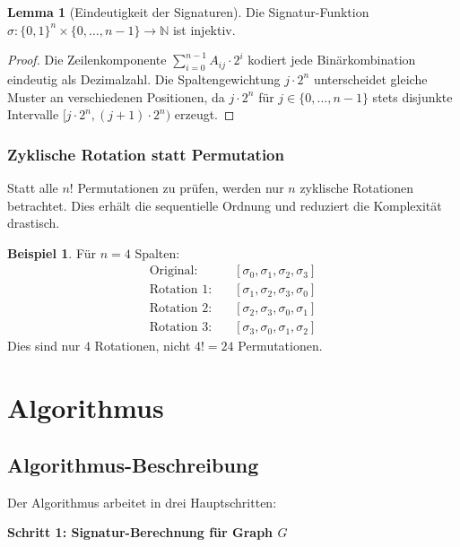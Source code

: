 \documentclass[a4paper,12pt]{article}
\theoremstyle{definition}
\newtheorem{beispiel}{Beispiel}
\newtheorem{lemma}{Lemma}
\begin{document}
\begin{lemma}[Eindeutigkeit der Signaturen]
	Die Signatur-Funktion $\sigma: \{0,1\}^n \times \{0,\ldots,n-1\} \to \mathbb{N}$ ist injektiv.
\end{lemma}

\begin{proof}
	Die Zeilenkomponente $\sum_{i=0}^{n-1} A_{ij} \cdot 2^i$ kodiert jede Binärkombination eindeutig als Dezimalzahl. Die Spaltengewichtung $j \cdot 2^n$ unterscheidet gleiche Muster an verschiedenen Positionen, da $j \cdot 2^n$ für $j \in \{0,\ldots,n-1\}$ stets disjunkte Intervalle $[j \cdot 2^n, (j+1) \cdot 2^n)$ erzeugt.
\end{proof}

\subsubsection{Zyklische Rotation statt Permutation}

Statt alle $n!$ Permutationen zu prüfen, werden nur $n$ zyklische Rotationen betrachtet. Dies erhält die sequentielle Ordnung und reduziert die Komplexität drastisch.

\begin{beispiel}
	Für $n=4$ Spalten:
	\begin{align*}
		\text{Original:} & \quad [\sigma_0, \sigma_1, \sigma_2, \sigma_3] \\
		\text{Rotation 1:} & \quad [\sigma_1, \sigma_2, \sigma_3, \sigma_0] \\
		\text{Rotation 2:} & \quad [\sigma_2, \sigma_3, \sigma_0, \sigma_1] \\
		\text{Rotation 3:} & \quad [\sigma_3, \sigma_0, \sigma_1, \sigma_2]
	\end{align*}
	Dies sind nur $4$ Rotationen, nicht $4! = 24$ Permutationen.
\end{beispiel}

\section{Algorithmus}

\subsection{Algorithmus-Beschreibung}

Der Algorithmus arbeitet in drei Hauptschritten:

\textbf{Schritt 1: Signatur-Berechnung für Graph $G$}
\end{document}
